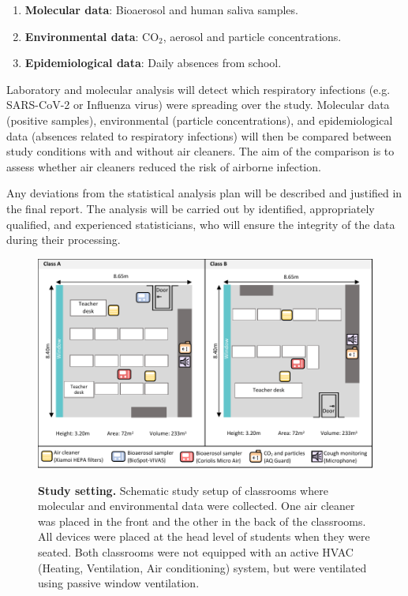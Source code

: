 \documentclass{article}
\begin{document}
\begin{enumerate}
    \item \textbf{Molecular data}: Bioaerosol and human saliva samples.
    \item \textbf{Environmental data}: CO$_2$, aerosol and particle concentrations.
    \item \textbf{Epidemiological data}: Daily absences from school.
\end{enumerate}
 
Laboratory and molecular analysis will detect which respiratory infections (e.g. SARS-CoV-2 or Influenza virus) were spreading over the study. Molecular data (positive samples), environmental (particle concentrations), and epidemiological data (absences related to respiratory infections) will then be compared between study conditions with and without air cleaners. The aim of the comparison is to assess whether air cleaners reduced the risk of airborne infection. \smallskip

Any deviations from the statistical analysis plan will be described and justified in the final report. The analysis will be carried out by identified, appropriately qualified, and experienced statisticians, who will ensure the integrity of the data during their processing.

\begin{figure}[!htpb]
    \centering
    \caption{\textbf{Study setting.} Schematic study setup of classrooms where molecular and environmental data were collected. One air cleaner was placed in the front and the other in the back of the classrooms. All devices were placed at the head level of students when they were seated. Both classrooms were not equipped with an active HVAC (Heating, Ventilation, Air conditioning) system, but were ventilated using passive window ventilation.}
    \includegraphics{study_setting.pdf}
    \label{fig:study_setting}
\end{figure}
\end{document}

